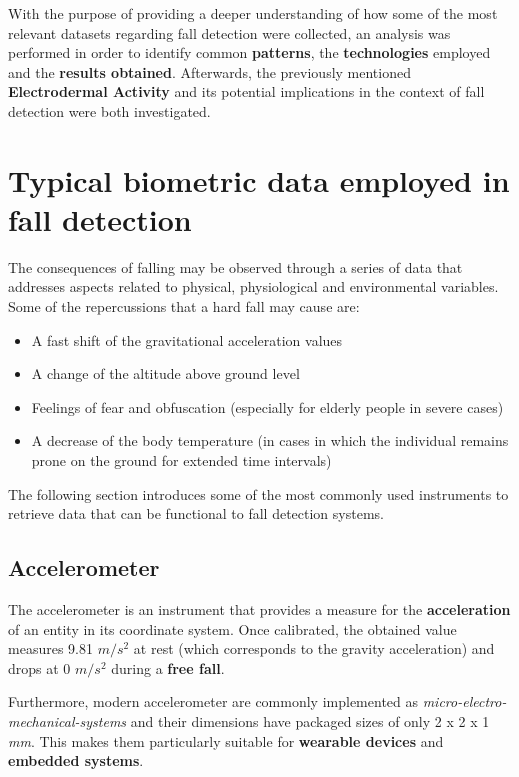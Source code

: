 \label{ch:analysis}

With the purpose of providing a deeper understanding of how some of the most relevant datasets regarding fall detection were collected, an analysis was performed in order to identify common \textbf{patterns}, the \textbf{technologies} employed and the \textbf{results obtained}. Afterwards, the previously mentioned \textbf{Electrodermal Activity} and its potential implications in the context of fall detection were both investigated.

\section{Typical biometric data employed in fall detection}\label{sec:hardware}

The consequences of falling may be observed through a series of data that addresses aspects related to physical, physiological and environmental variables. Some of the repercussions that a hard fall may cause are:

\begin{itemize}
    \item A fast shift of the gravitational acceleration values
    \item A change of the altitude above ground level
    \item Feelings of fear and obfuscation (especially for elderly people in severe cases)
    \item A decrease of the body temperature (in cases in which the individual remains prone on the ground for extended time intervals)
\end{itemize}

The following section introduces some of the most commonly used instruments to retrieve data that can be functional to fall detection systems.

\subsection{Accelerometer}\label{subsec:accelerometer}

The accelerometer is an instrument that provides a measure for the \textbf{acceleration} of an entity in its coordinate system. Once calibrated, the obtained value measures 9.81 $m/s^2$ at rest (which corresponds to the gravity acceleration) and drops at 0 $m/s^2$ during a \textbf{free fall}.

Furthermore, modern accelerometer are commonly implemented as \emph{micro-electro-mechanical-systems} and their dimensions have packaged sizes of only 2 x 2 x 1 \textit{mm}. This makes them particularly suitable for \textbf{wearable devices} and \textbf{embedded systems}.

